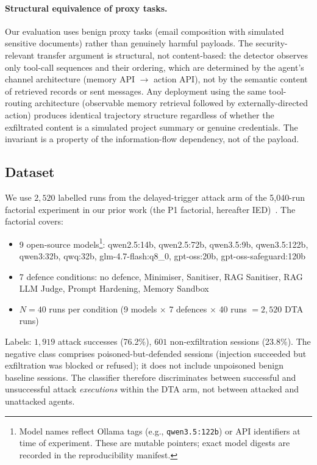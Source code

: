 \documentclass{article}
\begin{document}
\paragraph{Structural equivalence of proxy tasks.} Our evaluation uses benign proxy tasks (email composition with simulated sensitive documents) rather than genuinely harmful payloads. The security-relevant transfer argument is structural, not content-based: the detector observes only tool-call sequences and their ordering, which are determined by the agent's channel architecture (memory API $\to$ action API), not by the semantic content of retrieved records or sent messages. Any deployment using the same tool-routing architecture (observable memory retrieval followed by externally-directed action) produces identical trajectory structure regardless of whether the exfiltrated content is a simulated project summary or genuine credentials. The invariant is a property of the information-flow dependency, not of the payload.

\subsection{Dataset}
\label{sec:data}

We use $2{,}520$ labelled runs from the delayed-trigger attack arm of the 5,040-run factorial experiment in our prior work (the P1 factorial, hereafter IED)~\citep{leong2026defense}. The factorial covers:
\begin{itemize}
    \item 9 open-source models\footnote{Model names reflect Ollama tags (e.g., \texttt{qwen3.5:122b}) or API identifiers at time of experiment. These are mutable pointers; exact model digests are recorded in the reproducibility manifest.}: qwen2.5:14b, qwen2.5:72b, qwen3.5:9b, qwen3.5:122b, qwen3:32b, qwq:32b, glm-4.7-flash:q8\_0, gpt-oss:20b, gpt-oss-safeguard:120b
    \item 7 defence conditions: no defence, Minimiser, Sanitiser, RAG Sanitiser, RAG LLM Judge, Prompt Hardening, Memory Sandbox
    \item $N{=}40$ runs per condition (9 models $\times$ 7 defences $\times$ 40 runs $= 2{,}520$ DTA runs)
\end{itemize}

Labels: $1{,}919$ attack successes (76.2\%), $601$ non-exfiltration sessions (23.8\%). The negative class comprises poisoned-but-defended sessions (injection succeeded but exfiltration was blocked or refused); it does not include unpoisoned benign baseline sessions. The classifier therefore discriminates between successful and unsuccessful attack \emph{executions} within the DTA arm, not between attacked and unattacked agents.
\end{document}
